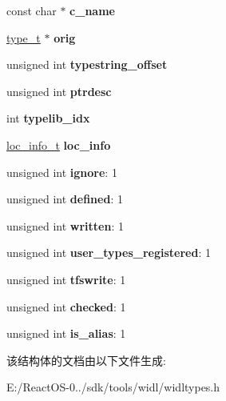 \begin{DoxyCompactItemize}
\begin{tabbing}
\end{tabbing}\item 
\mbox{\label{struct__type__t_a2272a776033df4f3292b4a6f1cf7d566}} 
const char $\ast$ {\bfseries c\+\_\+name}
\item 
\mbox{\label{struct__type__t_a3070608aa3d2932f3d2195b10f75b231}} 
\hyperlink{struct__type__t}{type\+\_\+t} $\ast$ {\bfseries orig}
\item 
\mbox{\label{struct__type__t_a6db45ce3661143eabe93746b93b1648f}} 
unsigned int {\bfseries typestring\+\_\+offset}
\item 
\mbox{\label{struct__type__t_a4a30af37bd3feef4e1509ca55f945fcf}} 
unsigned int {\bfseries ptrdesc}
\item 
\mbox{\label{struct__type__t_a428c35c7984a77533b841d2910ab17e0}} 
int {\bfseries typelib\+\_\+idx}
\item 
\mbox{\label{struct__type__t_a3e66ff28e1b16de1971fb7e95a9f9c73}} 
\hyperlink{struct__loc__info__t}{loc\+\_\+info\+\_\+t} {\bfseries loc\+\_\+info}
\item 
\mbox{\label{struct__type__t_a82a205d54205e6cef35c18090919ee7c}} 
unsigned int {\bfseries ignore}\+: 1
\item 
\mbox{\label{struct__type__t_a9753db92801cb5fdb2ad90053fdb5a37}} 
unsigned int {\bfseries defined}\+: 1
\item 
\mbox{\label{struct__type__t_ab2c1b0759de4abe42728128bc96767af}} 
unsigned int {\bfseries written}\+: 1
\item 
\mbox{\label{struct__type__t_a3064fd51579caba555b1e2da9eb0bc39}} 
unsigned int {\bfseries user\+\_\+types\+\_\+registered}\+: 1
\item 
\mbox{\label{struct__type__t_ad9c581b8a76c6270c0eb0c47b3758163}} 
unsigned int {\bfseries tfswrite}\+: 1
\item 
\mbox{\label{struct__type__t_ac21c6498a1f3c5fb9b5494821f9751e1}} 
unsigned int {\bfseries checked}\+: 1
\item 
\mbox{\label{struct__type__t_a6931ab207c569b6763534a4755d23a96}} 
unsigned int {\bfseries is\+\_\+alias}\+: 1
\end{DoxyCompactItemize}


该结构体的文档由以下文件生成\+:\begin{DoxyCompactItemize}
\item 
E\+:/\+React\+O\+S-\/0../sdk/tools/widl/widltypes.\+h\end{DoxyCompactItemize}
